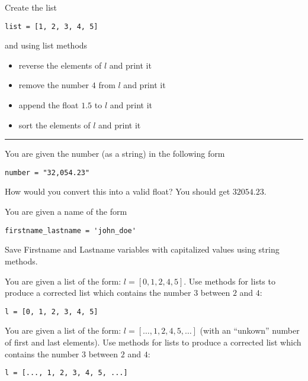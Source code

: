\documentclass[11pt]{exam}
\begin{document}
\begin{questions}
\item Create the list 
\begin{verbatim}
list = [1, 2, 3, 4, 5]
\end{verbatim}
and using list methods
\begin{itemize}
\item reverse the elements of $l$ and print it
\item remove the number $4$ from $l$ and print it 
\item append the float $1.5$ to $l$ and print it
\item sort the elements of $l$ and print it
\end{itemize}



\begin{center}
\noindent\rule{10cm}{0.4pt}
\end{center}

\pagebreak 

\item You are given the number (as a string) in the following form
\begin{verbatim}
number = "32,054.23"
\end{verbatim}
How would you convert this into a valid float? You should get $32054.23$.


\item You are given a name of the form 
\begin{verbatim}
firstname_lastname = 'john_doe'
\end{verbatim}
Save Firstname and Lastname variables with capitalized values using string methods.

\item You are given a list of the form: $l = [0, 1, 2, 4, 5]$. Use methods for lists to produce a corrected list which contains the number $3$ between $2$ and $4$:

\begin{verbatim}
l = [0, 1, 2, 3, 4, 5]
\end{verbatim}

\item You are given a list of the form: $l = [\dots, 1, 2, 4, 5, \dots]$ (with an ``unkown'' number of first and last elements). Use methods for lists to produce a corrected list which contains the number $3$ between $2$ and $4$:

\begin{verbatim}
l = [..., 1, 2, 3, 4, 5, ...]
\end{verbatim}


\end{questions}
\end{document}
